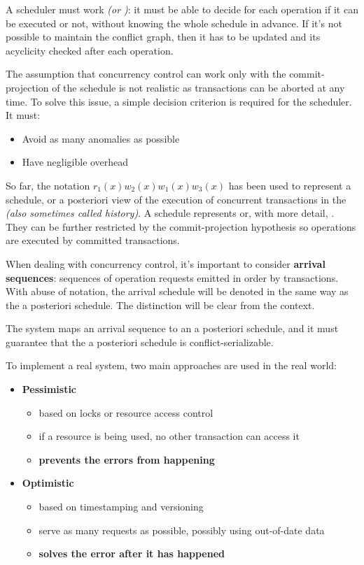 \documentclass[english]{article}
\begin{document}
A scheduler must work  \textit{(or )}: it must be able to decide for each operation if it can be executed or not, without knowing the whole schedule in advance.
If it's not possible to maintain the conflict graph, then it has to be updated and its acyclicity checked after each operation.

The assumption that concurrency control can work only with the commit-projection of the schedule is not realistic as transactions can be aborted at any time.
To solve this issue, a simple decision criterion is required for the scheduler.
It must:

\begin{itemize}
  \item Avoid as many anomalies as possible
  \item Have negligible overhead
\end{itemize}

So far, the notation \(r_1(x) w_2(x) w_1(x) w_3(x)\) has been used to represent a schedule, or a posteriori view of the execution of concurrent transactions in the \dbms \textit{(also sometimes called history)}.
A schedule represents  or, with more detail, .
They can be further restricted by the commit-projection hypothesis so operations are executed by committed transactions.

When dealing with concurrency control, it's important to consider \textbf{arrival sequences}: sequences of operation requests emitted in order by transactions.
With abuse of notation, the arrival schedule will be denoted in the same way as the a posteriori schedule.
The distinction will be clear from the context.

The \CC system maps an arrival sequence to an a posteriori schedule, and it must guarantee that the a posteriori schedule is conflict-serializable.

\bigskip
To implement a real \CC system, two main approaches are used in the real world:

\begin{itemize}
  \item \textbf{Pessimistic}
        \begin{itemize}
          \item based on locks or resource access control
          \item if a resource is being used, no other transaction can access it
          \item \textbf{prevents the errors from happening}
        \end{itemize}
  \item \textbf{Optimistic}
        \begin{itemize}
          \item based on timestamping and versioning
          \item serve as many requests as possible, possibly using out-of-date data
          \item \textbf{solves the error after it has happened}
        \end{itemize}
\end{itemize}
\end{document}
